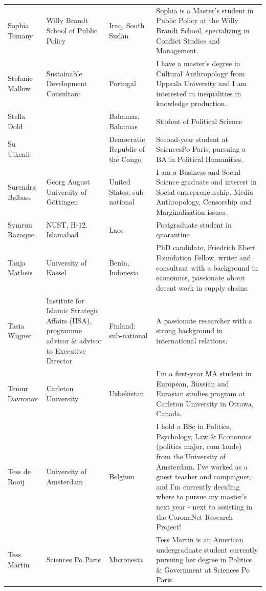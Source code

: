 \documentclass[
]{article}
\begin{document}
\begin{longtable}[t]{l>{\raggedright\arraybackslash}p{2cm}>{\raggedright\arraybackslash}p{2cm}>{\raggedright\arraybackslash}p{3cm}}
Sophia Tomany & Willy Brandt School of Public Policy & Iraq, South Sudan & Sophia is a Master's student in Public Policy at the Willy Brandt School, specializing in Conflict Studies and Management.\\
\addlinespace
\rowcolor{gray!6}  Stefanie Mallow & Sustainable Development Consultant & Portugal & I have a master's degree in Cultural Anthropology from Uppsala University and I am interested in inequalities in knowledge production.\\
Stella Dold &  & Bahamas, Bahamas & Student of Political Science\\
\rowcolor{gray!6}  Su Ülkenli &  & Democratic Republic of the Congo & Second-year student at SciencesPo Paris, pursuing a BA in Political Humanities.\\
Surendra Belbase & Georg August University of Göttingen & United States: sub-national & I am a Business and Social Science graduate and interest in Social entrepreneurship, Media Anthropology, Censorship and Marginalisation issues.\\
\rowcolor{gray!6}  Symrun Razaque & NUST, H-12. Islamabad & Laos & Postgraduate student in quarantine\\
\addlinespace
Tanja Matheis & University of Kassel & Benin, Indonesia & PhD candidate, Friedrich Ebert Foundation Fellow, writer and consultant with a background in economics, passionate about decent work in supply chains.\\
\rowcolor{gray!6}  Tasia Wagner & Institute for Islamic Strategic Affairs (IISA),  programme advisor \& advisor to Executive Director & Finland: sub-national & A passionate researcher with a strong background in international relations.\\
Temur Davronov & Carleton University & Uzbekistan & I'm a first-year MA student in European, Russian and Eurasian studies program at Carleton University in Ottawa, Canada.\\
\rowcolor{gray!6}  Tess de Rooij & University of Amsterdam & Belgium & I hold a BSc in Politics, Psychology, Law \& Economics (politics major, cum laude) from the University of Amsterdam. I've worked as a guest teacher and campaigner, and I'm currently deciding where to pursue my master's next year - next to assisting in the CoronaNet Research Project!\\
Tess Martin & Sciences Po Paris & Micronesia & Tess Martin is an American undergraduate student currently pursuing her degree in Politics \& Government at Sciences Po Paris.\\

\end{longtable}
\end{document}

